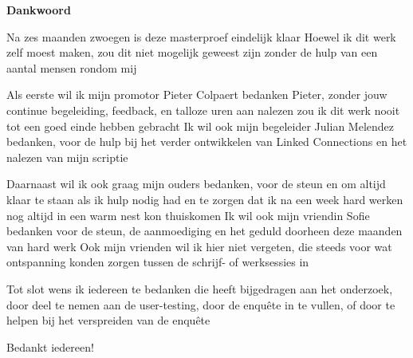 \thispagestyle{empty}    %
\begin{center}
\textbf{Dankwoord}
\end{center}

Na zes maanden zwoegen is deze masterproef eindelijk klaar Hoewel ik dit werk zelf moest maken, zou dit niet mogelijk geweest zijn zonder de hulp van een aantal mensen rondom mij

Als eerste wil ik mijn promotor Pieter Colpaert bedanken Pieter, zonder jouw continue begeleiding, feedback, en talloze uren aan nalezen zou ik dit werk nooit tot een goed einde hebben gebracht Ik wil ook mijn begeleider Julian Melendez bedanken, voor de hulp bij het verder ontwikkelen van Linked Connections en het nalezen van mijn scriptie

Daarnaast wil ik ook graag mijn ouders bedanken, voor de steun en om altijd klaar te staan als ik hulp nodig had en te zorgen dat ik na een week hard werken nog altijd in een warm nest kon thuiskomen Ik wil ook mijn vriendin Sofie bedanken voor de steun, de aanmoediging en het geduld doorheen deze maanden van hard werk Ook mijn vrienden wil ik hier niet vergeten, die steeds voor wat ontspanning konden zorgen tussen de schrijf- of werksessies in

Tot slot wens ik iedereen te bedanken die heeft bijgedragen aan het onderzoek, door deel te nemen aan de user-testing, door de enquête in te vullen, of door te helpen bij het verspreiden van de enquête

Bedankt iedereen! 